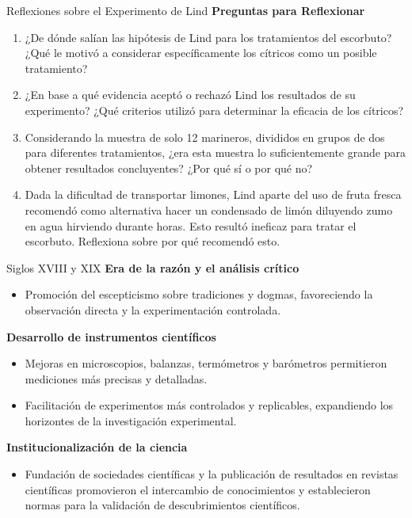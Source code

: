 ﻿\documentclass{beamer}
\begin{document}
\begin{frame}{Reflexiones sobre el Experimento de Lind}
    \textbf{Preguntas para Reflexionar}
    \begin{enumerate}
        \item ¿De dónde salían las hipótesis de Lind para los tratamientos del escorbuto? ¿Qué le motivó a considerar específicamente los cítricos como un posible tratamiento?
        \item ¿En base a qué evidencia aceptó o rechazó Lind los resultados de su experimento? ¿Qué criterios utilizó para determinar la eficacia de los cítricos?
        \item Considerando la muestra de solo 12 marineros, divididos en grupos de dos para diferentes tratamientos, ¿era esta muestra lo suficientemente grande para obtener resultados concluyentes? ¿Por qué sí o por qué no?
        \item Dada la dificultad de transportar limones, Lind aparte del uso de fruta fresca recomendó como alternativa hacer un condensado de limón diluyendo zumo en agua hirviendo durante horas. Esto resultó ineficaz para tratar el escorbuto. Reflexiona sobre por qué recomendó esto.
    \end{enumerate}
\end{frame}


\begin{frame}{Siglos XVIII y XIX}
    \textbf{Era de la razón y el análisis crítico}
    \begin{itemize}
        \item Promoción del escepticismo sobre tradiciones y dogmas, favoreciendo la observación directa y la experimentación controlada.
    \end{itemize}
    
    \textbf{Desarrollo de instrumentos científicos}
    \begin{itemize}
        \item Mejoras en microscopios, balanzas, termómetros y barómetros permitieron mediciones más precisas y detalladas.
        \item Facilitación de experimentos más controlados y replicables, expandiendo los horizontes de la investigación experimental.
    \end{itemize}
    
    \textbf{Institucionalización de la ciencia}
    \begin{itemize}
        \item Fundación de sociedades científicas y la publicación de resultados en revistas científicas promovieron el intercambio de conocimientos y establecieron normas para la validación de descubrimientos científicos.
    \end{itemize}
\end{frame}
\end{document}

